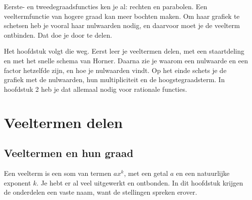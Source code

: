 %



Eerste- en tweedegraadsfuncties ken je al: rechten en parabolen. Een veeltermfunctie van hogere graad kan meer bochten maken. Om haar grafiek te schetsen heb je vooral haar nulwaarden nodig, en daarvoor moet je de veelterm ontbinden. Dat doe je door te delen.

Het hoofdstuk volgt die weg. Eerst leer je veeltermen delen, met een staartdeling en met het snelle schema van Horner. Daarna zie je waarom een nulwaarde en een factor hetzelfde zijn, en hoe je nulwaarden vindt. Op het einde schets je de grafiek met de nulwaarden, hun multipliciteit en de hoogstegraadsterm. In hoofdstuk 2 heb je dat allemaal nodig voor rationale functies.

\begin{oefeningen}[Start]

\end{oefeningen}

\section{Veeltermen delen}

\subsection{Veeltermen en hun graad}

Een veelterm is een som van termen $a x^k$, met een getal $a$ en een natuurlijke exponent $k$. Je hebt er al veel uitgewerkt en ontbonden. In dit hoofdstuk krijgen de onderdelen een vaste naam, want de stellingen spreken erover.

